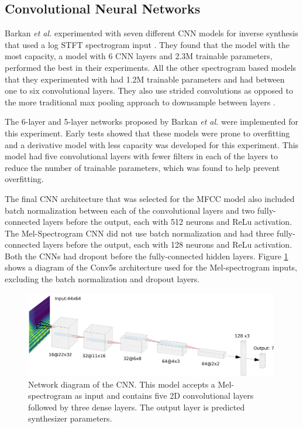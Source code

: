 \subsection{Convolutional Neural Networks}
Barkan \textit{et al.} experimented with seven different CNN models for inverse synthesis that used a log STFT spectrogram input \cite{barkan2019inversynth}. They found that the model with the most capacity, a model with 6 CNN layers and 2.3M trainable parameters, performed the best in their experiments. All the other spectrogram based models that they experimented with had 1.2M trainable parameters and had between one to six convolutional layers. They also use strided convolutions as opposed to the more traditional max pooling approach to downsample between layers \cite{goodfellow2016deep}.

The 6-layer and 5-layer networks proposed by Barkan \textit{et al.} were implemented for this experiment. Early tests showed that these models were prone to overfitting and a derivative model with less capacity was developed for this experiment. This model had five convolutional layers with fewer filters in each of the layers to reduce the number of trainable parameters, which was found to help prevent overfitting.

The final CNN architecture that was selected for the MFCC model also included batch normalization between each of the convolutional layers and two fully-connected layers before the output, each with 512 neurons and ReLu activation. The Mel-Spectrogram CNN did not use batch normalization and had three fully-connected layers before the output, each with 128 neurons and ReLu activation. Both the CNNs had dropout before the fully-connected hidden layers. Figure \ref{fig:conv5s} shows a diagram of the Conv5s architecture used for the Mel-spectrogram inputs, excluding the batch normalization and dropout layers.

\begin{figure}[ht]
    \centering
    \includegraphics[width=0.99\textwidth]{figures/inverse-synth/CONV5s_Diagram.png}
    \caption{Network diagram of the CNN. This model accepts a Mel-spectrogram as input and contains five 2D convolutional layers followed by three dense layers. The output layer is predicted synthesizer parameters.}
    \label{fig:conv5s}
\end{figure}

